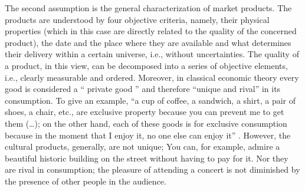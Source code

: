 \documentclass[a4paper, 12pt, openright, oneside, german, french, brazil, english, article]{abntex2}
\begin{document}
	The second assumption is the general characterization of market products. The products are understood by four objective criteria, namely, their physical properties (which in this case are directly related to the quality of the concerned product), the date and the place where they are available and what determines their delivery within a certain universe, i.e., without uncertainties. The quality of a product, in this view, can be decomposed into a series of objective elements, i.e., clearly measurable and ordered. Moreover, in classical economic theory every good is considered a `` private good '' and therefore ``unique and rival'' in its consumption. To give an example, ``a cup of coffee, a sandwich, a shirt, a pair of shoes, a chair, etc., are exclusive property because you can prevent me to get them (\ldots); on the other hand, each of these goods is for exclusive consumption because in the moment that I enjoy it, no one else can enjoy it'' \cite[p. 29]{tolila2007cultura}. However, the cultural products, generally, are not unique; You can, for example, admire a beautiful historic building on the street without having to pay for it. Nor they are rival in consumption; the pleasure of attending a concert is not diminished by the presence of other people in the audience.
	
	
\end{document}
